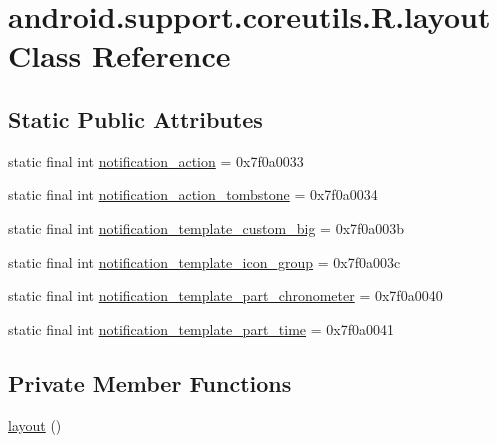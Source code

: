 \hypertarget{classandroid_1_1support_1_1coreutils_1_1_r_1_1layout}{}\section{android.\+support.\+coreutils.\+R.\+layout Class Reference}
\label{classandroid_1_1support_1_1coreutils_1_1_r_1_1layout}
\subsection*{Static Public Attributes}
\begin{DoxyCompactItemize}
\item 
static final int \mbox{\hyperlink{classandroid_1_1support_1_1coreutils_1_1_r_1_1layout_a5e1804f7a96ee0ab4e11a27875be0951}{notification\+\_\+action}} = 0x7f0a0033
\item 
static final int \mbox{\hyperlink{classandroid_1_1support_1_1coreutils_1_1_r_1_1layout_a6d1bc2179e1826704db862bcedbdb322}{notification\+\_\+action\+\_\+tombstone}} = 0x7f0a0034
\item 
static final int \mbox{\hyperlink{classandroid_1_1support_1_1coreutils_1_1_r_1_1layout_a1e82ecf13e5dff977c5ab5e5486ce4fc}{notification\+\_\+template\+\_\+custom\+\_\+big}} = 0x7f0a003b
\item 
static final int \mbox{\hyperlink{classandroid_1_1support_1_1coreutils_1_1_r_1_1layout_ac37f0494791c27289807b7312e952167}{notification\+\_\+template\+\_\+icon\+\_\+group}} = 0x7f0a003c
\item 
static final int \mbox{\hyperlink{classandroid_1_1support_1_1coreutils_1_1_r_1_1layout_a3290b638115231674c843239185ff25f}{notification\+\_\+template\+\_\+part\+\_\+chronometer}} = 0x7f0a0040
\item 
static final int \mbox{\hyperlink{classandroid_1_1support_1_1coreutils_1_1_r_1_1layout_ac91cfa7131f75c5f3bed1d28fce1b717}{notification\+\_\+template\+\_\+part\+\_\+time}} = 0x7f0a0041
\end{DoxyCompactItemize}
\subsection*{Private Member Functions}
\begin{DoxyCompactItemize}
\item 
\mbox{\hyperlink{classandroid_1_1support_1_1coreutils_1_1_r_1_1layout_a7a0f5a5cd2d21f29a22bf891bd461917}{layout}} ()
\end{DoxyCompactItemize}



